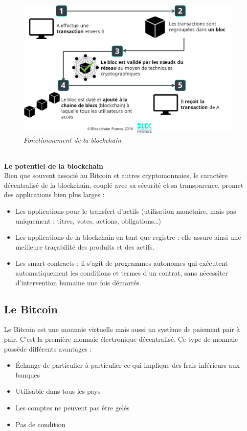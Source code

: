 \documentclass[conference]{IEEEtran}
\begin{document}
\begin{figure}[!h]
    \centering
    \includegraphics[scale=0.3]{blck-fonctionnement.png}
    \caption{\textit{Fonctionnement de la blockchain} \cite{bcfr}}
    \label{fig:blck-fonctionnement}
\end{figure}
\vspace{0.3cm}\\
\textbf{Le potentiel de la blockchain} \cite{bcfr}\\

Bien que souvent associé au Bitcoin et autres cryptomonnaies, le caractère décentralisé de la blockchain, couplé avec sa sécurité et sa transparence, promet des applications bien plus larges : 
\begin{itemize}
    \item Les applications pour le transfert d’actifs (utilisation monétaire, mais pas uniquement : titres, votes, actions, obligations…)
    \item Les applications de la blockchain en tant que registre : elle assure ainsi une meilleure traçabilité des produits et des actifs.
    \item Les smart contracts : il s’agit de programmes autonomes qui exécutent automatiquement les conditions et termes d’un contrat, sans nécessiter d’intervention humaine une fois démarrés. 
\end{itemize} 

\newpage

\subsection{Le Bitcoin}

Le Bitcoin est une monnaie virtuelle mais aussi un système de paiement pair à pair. C'est la première monnaie électronique décentralisé. Ce type de monnaie possède différents avantages : 
\begin{itemize}
    \item Échange de particulier à particulier ce qui implique des frais inférieurs aux banques
    \item Utilisable dans tous les pays
    \item Les comptes ne peuvent pas être gelés
    \item Pas de condition
\end{itemize}
\vspace{0.3cm}
\end{document}
